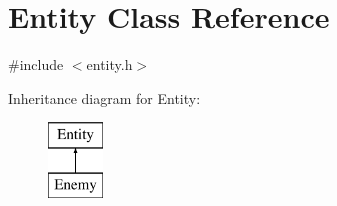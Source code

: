 \hypertarget{class_entity}{\section{Entity Class Reference}
\label{class_entity}
}


{\ttfamily \#include $<$entity.\-h$>$}

Inheritance diagram for Entity\-:\begin{figure}[H]
\begin{center}
\leavevmode
\includegraphics[height=2.000000cm]{class_entity}
\end{center}
\end{figure}
